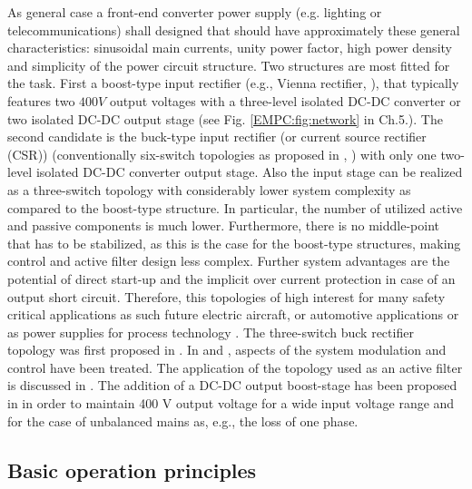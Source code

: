 As  general case a front-end  converter power supply (e.g. lighting or telecommunications) shall designed that should have approximately these general characteristics: sinusoidal main currents, unity power factor, high power density and simplicity of the power circuit structure. Two structures are most fitted for the task. First a boost-type input rectifier (e.g., Vienna rectifier, \cite{kolar1996design}), that typically features two $400V$ output voltages with a three-level isolated  DC-DC  converter  or  two  isolated  DC-DC  output  stage (see Fig. \ref{EMPC:fig:network} in Ch.5.). The second candidate is the buck-type  input  rectifier (or current source rectifier (CSR))  (conventionally  six-switch topologies as proposed in \cite{zargari1993current}, \cite{sato1993state}) with only one two-level isolated  DC-DC  converter  output  stage.  Also the  input  stage  can be realized as a three-switch topology with considerably  lower  system  complexity  as  compared  to  the boost-type structure. In particular, the number of utilized active and passive components is much lower. Furthermore, there is no middle-point that has to be stabilized, as this is the case for the boost-type structures, making control and active filter design less complex. Further system advantages are the potential of direct start-up and the implicit over current protection in case of an output short circuit. Therefore, this topologies of high interest for many safety critical applications as such future electric aircraft, or automotive applications or as power supplies for process technology \cite{nussbaumer2007comprehensive}.
The three-switch buck rectifier topology was first proposed in \cite{malesani1987three}. In \cite{itoh1989steady} and \cite{tooth2000effects}, aspects of the system modulation and control have been treated. The application of the topology used as an active filter is discussed in \cite{salo2005three}.  The addition of a DC-DC output boost-stage has been proposed in \cite{baumannnew} in order to maintain 400 V output voltage for a wide input voltage range and for the case of unbalanced mains as, e.g., the loss of one phase.

\subsection{Basic operation principles}\label{BASICCSR:sec:OperationPrinciple}

